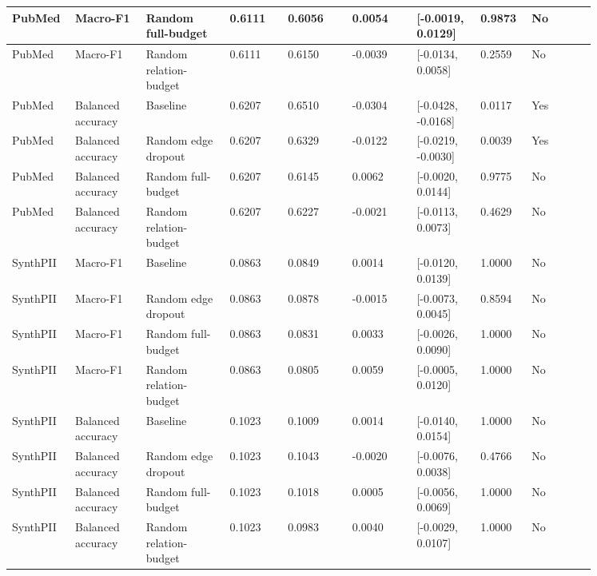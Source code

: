 \documentclass[preprint,12pt]{elsarticle}
\begin{document}
\begin{landscape}
\begin{longtable}{|L{0.06\linewidth}|L{0.11\linewidth}|L{0.13\linewidth}|C{0.09\linewidth}|C{0.10\linewidth}|C{0.10\linewidth}|C{0.09\linewidth}|C{0.07\linewidth}|C{0.10\linewidth}|}
PubMed & Macro-F1 & Random full-budget & 0.6111 & 0.6056 & 0.0054 & [-0.0019, 0.0129] & 0.9873 & No \\ \hline
PubMed & Macro-F1 & Random relation-budget & 0.6111 & 0.6150 & -0.0039 & [-0.0134, 0.0058] & 0.2559 & No \\ \hline
PubMed & Balanced accuracy & Baseline & 0.6207 & 0.6510 & -0.0304 & [-0.0428, -0.0168] & 0.0117 & Yes \\ \hline
PubMed & Balanced accuracy & Random edge dropout & 0.6207 & 0.6329 & -0.0122 & [-0.0219, -0.0030] & 0.0039 & Yes \\ \hline
PubMed & Balanced accuracy & Random full-budget & 0.6207 & 0.6145 & 0.0062 & [-0.0020, 0.0144] & 0.9775 & No \\ \hline
PubMed & Balanced accuracy & Random relation-budget & 0.6207 & 0.6227 & -0.0021 & [-0.0113, 0.0073] & 0.4629 & No \\ \hline
SynthPII & Macro-F1 & Baseline & 0.0863 & 0.0849 & 0.0014 & [-0.0120, 0.0139] & 1.0000 & No \\ \hline
SynthPII & Macro-F1 & Random edge dropout & 0.0863 & 0.0878 & -0.0015 & [-0.0073, 0.0045] & 0.8594 & No \\ \hline
SynthPII & Macro-F1 & Random full-budget & 0.0863 & 0.0831 & 0.0033 & [-0.0026, 0.0090] & 1.0000 & No \\ \hline
SynthPII & Macro-F1 & Random relation-budget & 0.0863 & 0.0805 & 0.0059 & [-0.0005, 0.0120] & 1.0000 & No \\ \hline
SynthPII & Balanced accuracy & Baseline & 0.1023 & 0.1009 & 0.0014 & [-0.0140, 0.0154] & 1.0000 & No \\ \hline
SynthPII & Balanced accuracy & Random edge dropout & 0.1023 & 0.1043 & -0.0020 & [-0.0076, 0.0038] & 0.4766 & No \\ \hline
SynthPII & Balanced accuracy & Random full-budget & 0.1023 & 0.1018 & 0.0005 & [-0.0056, 0.0069] & 1.0000 & No \\ \hline
SynthPII & Balanced accuracy & Random relation-budget & 0.1023 & 0.0983 & 0.0040 & [-0.0029, 0.0107] & 1.0000 & No \\ \hline
\end{longtable}
\endgroup
\end{landscape}
\end{document}
